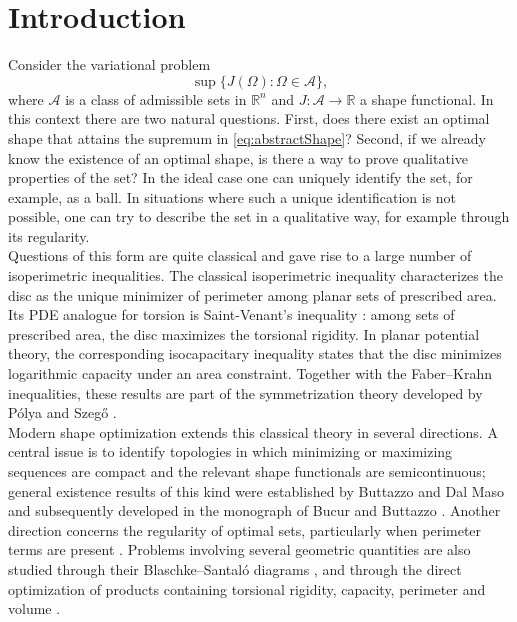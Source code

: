 \documentclass[11pt]{article}
\theoremstyle{plain}
\numberwithin{equation}{section}
\theoremstyle{definition}
\def \Om{\Omega}
\def \R {\mathbb{R}}
\def \mc{\mathcal}
\begin{document}
    \section{Introduction}
    Consider the variational problem
    \begin{equation}
        \label{eq:abstractShape}
        \sup\{J(\Om):\Omega \in \mc A\},
    \end{equation}
    where $\mc A$ is a class of admissible sets in $\R^n$ and $J:\mc A \to \R$ a shape functional. In this context there are two natural questions. First, does there exist an optimal shape that attains the supremum in \eqref{eq:abstractShape}? Second, if we already know the existence of an optimal shape, is there a way to prove qualitative properties of the set? In the ideal case one can uniquely identify the set, for example, as a ball. In situations where such a unique identification is not possible, one can try to describe the set in a qualitative way, for example through its regularity.\\
    Questions of this form are quite classical and gave rise to a large number of isoperimetric inequalities. The classical isoperimetric inequality characterizes the disc as the unique minimizer of perimeter among planar sets of prescribed area. Its PDE analogue for torsion is Saint-Venant’s inequality \cite{SaintVenant1856Torsion}: among sets of prescribed area, the disc maximizes the torsional rigidity. In planar potential theory, the corresponding isocapacitary inequality states that the disc minimizes logarithmic capacity under an area constraint. Together with the Faber–Krahn inequalities, these results are part of the symmetrization theory developed by Pólya and Szegő \cite{Plya1948TorsionalRP,polya1951isoperimetric}.\\
    Modern shape optimization extends this classical theory in several directions. A central issue is to identify topologies in which minimizing or maximizing sequences are compact and the relevant shape functionals are semicontinuous; general existence results of this kind were established by Buttazzo and Dal Maso and subsequently developed in the monograph of Bucur and Buttazzo \cite{ButtEx,bucur:hal-00414080}. Another direction concerns the regularity of optimal sets, particularly when perimeter terms are present \cite{lamboley2012regularity,DEPHILIPPIS2018147}. Problems involving several geometric quantities are also studied through their Blaschke–Santaló diagrams \cite{lucardesi2022blaschke}, and through the direct optimization of products containing torsional rigidity, capacity, perimeter and volume \cite{https://doi.org/10.1112/blms.12422,briani2021some,van2023some}.\\
\end{document}
